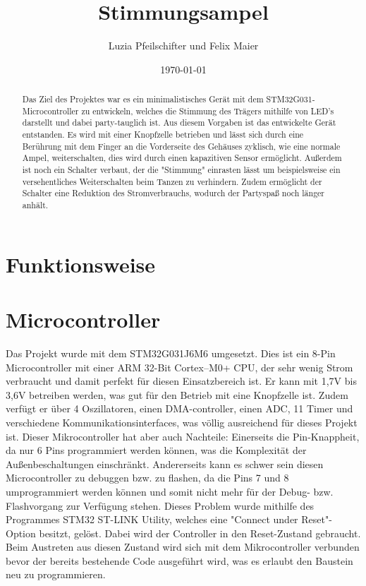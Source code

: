 \documentclass[a4paper,
DIV=13,
12pt,
BCOR=10mm,
department=FakEI,
parskip=half,
automark,
]{article}
\date{\today}
\title{Stimmungsampel}
\author{Luzia Pfeilschifter und Felix Maier}
\begin{document}
\maketitle
\cleardoublepage
\begin{abstract}
Das Ziel des Projektes war es ein minimalistisches Gerät mit dem STM32G031-Microcontroller zu entwickeln, welches die Stimmung des Trägers mithilfe von LED's darstellt und dabei party-tauglich ist. Aus diesem Vorgaben ist das entwickelte Gerät entstanden. Es wird mit einer Knopfzelle betrieben und lässt sich durch eine Berührung mit dem Finger an die Vorderseite des Gehäuses zyklisch, wie eine normale Ampel, weiterschalten, dies wird durch einen kapazitiven Sensor ermöglicht. Außerdem ist noch ein Schalter verbaut, der die "Stimmung" einrasten lässt um beispielsweise ein versehentliches Weiterschalten beim Tanzen zu verhindern. Zudem ermöglicht der Schalter eine Reduktion des Stromverbrauchs, wodurch der Partyspaß noch länger anhält.
\end{abstract}
\cleardoublepage
\tableofcontents

\cleardoublepage
\section{Funktionsweise}
\newpage
\section{Microcontroller}

Das Projekt wurde mit dem STM32G031J6M6 umgesetzt. Dies ist ein 8-Pin Microcontroller mit einer ARM 32-Bit Cortex–M0+ CPU, der sehr wenig Strom verbraucht und damit perfekt für diesen Einsatzbereich ist. Er kann mit 1,7V bis 3,6V betreiben werden, was gut für den Betrieb mit eine Knopfzelle ist. Zudem verfügt er über 4 Oszillatoren, einen DMA-controller, einen ADC, 11 Timer und verschiedene Kommunikationsinterfaces, was völlig ausreichend für dieses Projekt ist. Dieser Mikrocontroller hat aber auch Nachteile: Einerseits die Pin-Knappheit, da nur 6 Pins programmiert werden können, was die Komplexität der Außenbeschaltungen einschränkt. Andererseits kann es schwer sein diesen Microcontroller zu debuggen bzw. zu flashen, da die Pins 7 und 8 umprogrammiert werden können und somit nicht mehr für der Debug- bzw. Flashvorgang zur Verfügung stehen. Dieses Problem wurde mithilfe des Programmes STM32 ST-LINK Utility, welches eine "Connect under Reset"-Option besitzt, gelöst. Dabei wird der Controller in den Reset-Zustand gebraucht. Beim Austreten aus diesen Zustand wird sich mit dem Mikrocontroller verbunden bevor der bereits bestehende Code ausgeführt wird, was es erlaubt den Baustein neu zu programmieren.
\end{document}
